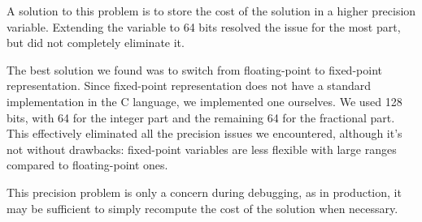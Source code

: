 A solution to this problem is to store the cost of the solution in a higher precision variable.
Extending the variable to 64 bits resolved the issue for the most part, but did not completely eliminate it.

The best solution we found was to switch from floating-point to fixed-point representation.
Since fixed-point representation does not have a standard implementation in the C language, we implemented one ourselves.
We used 128 bits, with 64 for the integer part and the remaining 64 for the fractional part.
This effectively eliminated all the precision issues we encountered, although it's not without drawbacks: fixed-point variables are less flexible with large ranges compared to floating-point ones.

This precision problem is only a concern during debugging, as in production, it may be sufficient to simply recompute the cost of the solution when necessary.
